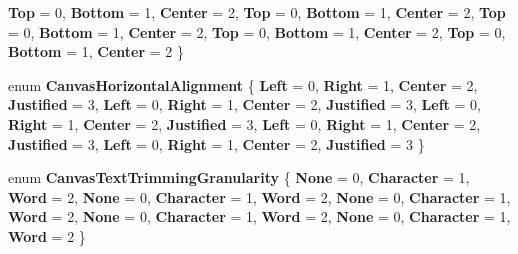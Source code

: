 \begin{DoxyCompactItemize}
{\bfseries Top} = 0, 
{\bfseries Bottom} = 1, 
{\bfseries Center} = 2, 
{\bfseries Top} = 0, 
\newline
{\bfseries Bottom} = 1, 
{\bfseries Center} = 2, 
{\bfseries Top} = 0, 
{\bfseries Bottom} = 1, 
\newline
{\bfseries Center} = 2, 
{\bfseries Top} = 0, 
{\bfseries Bottom} = 1, 
{\bfseries Center} = 2, 
\newline
{\bfseries Top} = 0, 
{\bfseries Bottom} = 1, 
{\bfseries Center} = 2
 \}
\item 
\mbox{\label{namespace_microsoft_1_1_graphics_1_1_canvas_1_1_text_afbe7037cb35da011cc144d6cb2d328f5}} 
enum {\bfseries Canvas\+Horizontal\+Alignment} \{ \newline
{\bfseries Left} = 0, 
{\bfseries Right} = 1, 
{\bfseries Center} = 2, 
{\bfseries Justified} = 3, 
\newline
{\bfseries Left} = 0, 
{\bfseries Right} = 1, 
{\bfseries Center} = 2, 
{\bfseries Justified} = 3, 
\newline
{\bfseries Left} = 0, 
{\bfseries Right} = 1, 
{\bfseries Center} = 2, 
{\bfseries Justified} = 3, 
\newline
{\bfseries Left} = 0, 
{\bfseries Right} = 1, 
{\bfseries Center} = 2, 
{\bfseries Justified} = 3, 
\newline
{\bfseries Left} = 0, 
{\bfseries Right} = 1, 
{\bfseries Center} = 2, 
{\bfseries Justified} = 3
 \}
\item 
\mbox{\label{namespace_microsoft_1_1_graphics_1_1_canvas_1_1_text_a24d5fc875e6366ffdebd4fc9db910c21}} 
enum {\bfseries Canvas\+Text\+Trimming\+Granularity} \{ \newline
{\bfseries None} = 0, 
{\bfseries Character} = 1, 
{\bfseries Word} = 2, 
{\bfseries None} = 0, 
\newline
{\bfseries Character} = 1, 
{\bfseries Word} = 2, 
{\bfseries None} = 0, 
{\bfseries Character} = 1, 
\newline
{\bfseries Word} = 2, 
{\bfseries None} = 0, 
{\bfseries Character} = 1, 
{\bfseries Word} = 2, 
\newline
{\bfseries None} = 0, 
{\bfseries Character} = 1, 
{\bfseries Word} = 2
 \}
\item 
\mbox{\label{namespace_microsoft_1_1_graphics_1_1_canvas_1_1_text_aad13d6b470583df1dcc8167f6568eb39}} 

\end{DoxyCompactItemize}
